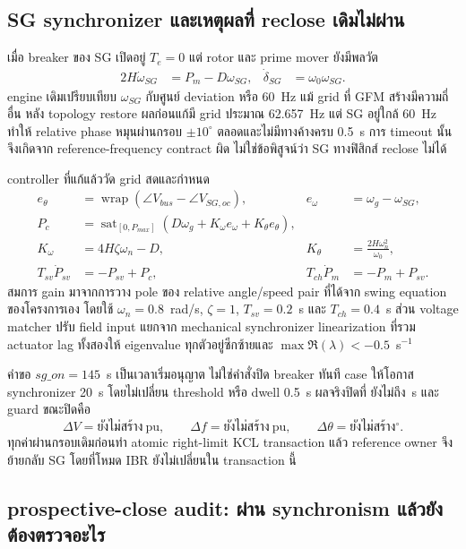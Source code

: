 \documentclass[12pt,a4paper]{article}
\newcommand{\RunReclose}{ยังไม่ถึง}
\newcommand{\RunSyncDV}{ยังไม่สร้าง}
\newcommand{\RunSyncDF}{ยังไม่สร้าง}
\newcommand{\RunSyncDTheta}{ยังไม่สร้าง}
\begin{document}
\subsection{SG synchronizer และเหตุผลที่ reclose เดิมไม่ผ่าน}

เมื่อ breaker ของ SG เปิดอยู่ $T_e=0$ แต่ rotor และ prime mover ยังมีพลวัต
\begin{align}
2H\dot\omega_{SG}&=P_m-D\omega_{SG}, & \dot\delta_{SG}&=\omega_0\omega_{SG}.
\end{align}
engine เดิมเปรียบเทียบ $\omega_{SG}$ กับศูนย์ deviation หรือ 60~Hz แม้ grid ที่ GFM สร้างมีความถี่อื่น
หลัง topology restore ผลก่อนแก้มี grid ประมาณ 62.657~Hz แต่ SG อยู่ใกล้ 60~Hz ทำให้ relative phase
หมุนผ่านกรอบ $\pm10^\circ$ ตลอดและไม่มีทางค้างครบ 0.5~s การ timeout นั้นจึงเกิดจาก reference-frequency
contract ผิด ไม่ใช่ข้อพิสูจน์ว่า SG ทางฟิสิกส์ reclose ไม่ได้

controller ที่แก้แล้ววัด grid สดและกำหนด
\begin{align}
e_\theta&=\operatorname{wrap}(\angle V_{bus}-\angle V_{SG,oc}), &
e_\omega&=\omega_g-\omega_{SG},\\
P_c&=\operatorname{sat}_{[0,P_{max}]}
\left(D\omega_g+K_\omega e_\omega+K_\theta e_\theta\right),\\
K_\omega&=4H\zeta\omega_n-D, &
K_\theta&=\frac{2H\omega_n^2}{\omega_0},\\
T_{sv}\dot P_{sv}&=-P_{sv}+P_c, &
T_{ch}\dot P_m&=-P_m+P_{sv}.
\end{align}
สมการ gain มาจากการวาง pole ของ relative angle/speed pair ที่ได้จาก swing equation ของโครงการเอง
โดยใช้ $\omega_n=0.8$~rad/s, $\zeta=1$, $T_{sv}=0.2$~s และ $T_{ch}=0.4$~s
ส่วน voltage matcher ปรับ field input แยกจาก mechanical synchronizer linearization ที่รวม actuator lag
ทั้งสองให้ eigenvalue ทุกตัวอยู่ซีกซ้ายและ $\max\Re(\lambda)<-0.5$~s$^{-1}$

คำขอ $sg\_on=145$~s เป็นเวลาเริ่มอนุญาต ไม่ใช่คำสั่งปิด breaker ทันที case ให้โอกาส synchronizer
20~s โดยไม่เปลี่ยน threshold หรือ dwell 0.5~s ผลจริงปิดที่ \RunReclose~s และ guard ขณะปิดคือ
\begin{equation}
\Delta V=\RunSyncDV~\text{pu},\qquad
\Delta f=\RunSyncDF~\text{pu},\qquad
\Delta\theta=\RunSyncDTheta^\circ.
\end{equation}
ทุกค่าผ่านกรอบเดิมก่อนทำ atomic right-limit KCL transaction แล้ว reference owner จึงย้ายกลับ SG
โดยที่โหมด IBR ยังไม่เปลี่ยนใน transaction นี้

\subsection{prospective-close audit: ผ่าน synchronism แล้วยังต้องตรวจอะไร}
\end{document}
